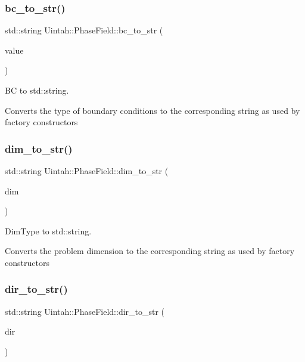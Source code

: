 \subsubsection{\texorpdfstring{bc\+\_\+to\+\_\+str()}{bc\_to\_str()}}
{\footnotesize\ttfamily std\+::string Uintah\+::\+Phase\+Field\+::bc\+\_\+to\+\_\+str (\begin{DoxyParamCaption}\item[{\hyperlink{namespaceUintah_1_1PhaseField_a148fba372aa3be96fd6eede7a2fa10b5}{BC}}]{value }\end{DoxyParamCaption})\hspace{0.3cm}{\ttfamily [inline]}}



BC to std\+::string. 

Converts the type of boundary conditions to the corresponding string as used by factory constructors \mbox{\label{namespaceUintah_1_1PhaseField_a89a79191f10636fd81e9900120c16bf3}} 
\subsubsection{\texorpdfstring{dim\+\_\+to\+\_\+str()}{dim\_to\_str()}}
{\footnotesize\ttfamily std\+::string Uintah\+::\+Phase\+Field\+::dim\+\_\+to\+\_\+str (\begin{DoxyParamCaption}\item[{\hyperlink{namespaceUintah_1_1PhaseField_a12bfc68444894dffdf0cb8d9cf0cc76a}{Dim\+Type}}]{dim }\end{DoxyParamCaption})\hspace{0.3cm}{\ttfamily [inline]}}



Dim\+Type to std\+::string. 

Converts the problem dimension to the corresponding string as used by factory constructors \mbox{\label{namespaceUintah_1_1PhaseField_a210a65278fe4cc9c19a428de018272ec}} 
\subsubsection{\texorpdfstring{dir\+\_\+to\+\_\+str()}{dir\_to\_str()}}
{\footnotesize\ttfamily std\+::string Uintah\+::\+Phase\+Field\+::dir\+\_\+to\+\_\+str (\begin{DoxyParamCaption}\item[{\hyperlink{namespaceUintah_1_1PhaseField_a94555da848596a419ae2c0e32649e1dc}{Dir\+Type}}]{dir }\end{DoxyParamCaption})\hspace{0.3cm}{\ttfamily [inline]}}



